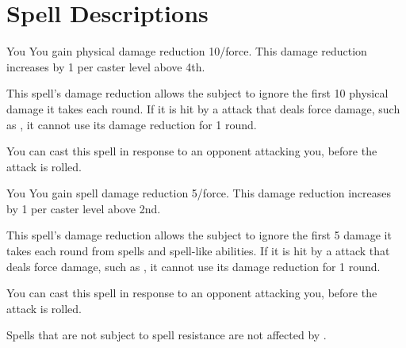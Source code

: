 \section{Spell Descriptions}

\small

\begin{comment}
\subsubsection{A}
\end{comment}

\begin{spelltarget}{You}
    \spelleffect You gain physical damage reduction 10/force. This damage reduction increases by 1 per caster level above 4th.
\end{spelltarget}
\spellnotes This spell's damage reduction allows the subject to ignore the first 10 physical damage it takes each round. If it is hit by a attack that deals force damage, such as , it cannot use its damage reduction for 1 round.

You can cast this spell in response to an opponent attacking you, before the attack is rolled.

\begin{spelltarget}{You}
    \spelleffect You gain spell damage reduction 5/force. This damage reduction increases by 1 per caster level above 2nd.
\end{spelltarget}
\spellnotes This spell's damage reduction allows the subject to ignore the first 5 damage it takes each round from spells and spell-like abilities. If it is hit by a attack that deals force damage, such as , it cannot use its damage reduction for 1 round.

You can cast this spell in response to an opponent attacking you, before the attack is rolled.

Spells that are not subject to spell resistance are not affected by .

